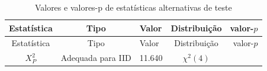 \documentclass[]{book}
\numberwithin{example}{chapter}
\numberwithin{remark}{chapter}
\numberwithin{definition}{chapter}
\begin{document}
\begin{longtable}[]{@{}cclcr@{}}
\caption{\label{tab:estaltteste}Valores e valores-p de estatísticas
alternativas de teste}\tabularnewline
\toprule
\begin{minipage}[b]{0.39\columnwidth}\centering\strut
Estatística\strut
\end{minipage} & \begin{minipage}[b]{0.15\columnwidth}\centering\strut
Tipo\strut
\end{minipage} & \begin{minipage}[b]{0.05\columnwidth}\raggedright\strut
Valor\strut
\end{minipage} & \begin{minipage}[b]{0.19\columnwidth}\centering\strut
Distribuição\strut
\end{minipage} & \begin{minipage}[b]{0.08\columnwidth}\raggedleft\strut
valor-\(p\)\strut
\end{minipage}\tabularnewline
\midrule
\endfirsthead
\toprule
\begin{minipage}[b]{0.39\columnwidth}\centering\strut
Estatística\strut
\end{minipage} & \begin{minipage}[b]{0.15\columnwidth}\centering\strut
Tipo\strut
\end{minipage} & \begin{minipage}[b]{0.05\columnwidth}\raggedright\strut
Valor\strut
\end{minipage} & \begin{minipage}[b]{0.19\columnwidth}\centering\strut
Distribuição\strut
\end{minipage} & \begin{minipage}[b]{0.08\columnwidth}\raggedleft\strut
valor-\(p\)\strut
\end{minipage}\tabularnewline
\midrule
\endhead
\begin{minipage}[t]{0.39\columnwidth}\centering\strut
\(X_{P}^{2}\)\strut
\end{minipage} & \begin{minipage}[t]{0.15\columnwidth}\centering\strut
Adequada para IID\strut
\end{minipage} & \begin{minipage}[t]{0.05\columnwidth}\raggedright\strut
11.640\strut
\end{minipage} & \begin{minipage}[t]{0.19\columnwidth}\centering\strut
\(\chi ^{2}(4)\)\strut
\end{minipage} & \begin{minipage}[t]{0.08\columnwidth}\raggedleft\strut

\end{minipage}
\end{longtable}
\end{document}
